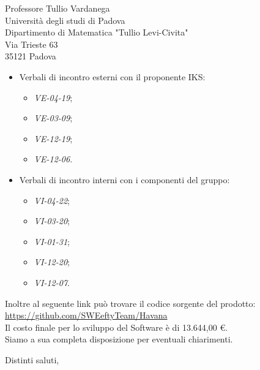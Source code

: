\documentclass[12pt]{letter} %
\begin{document}
\begin{letter}{Professore Tullio Vardanega \\ Università degli studi di Padova \\ Dipartimento di Matematica "Tullio Levi-Civita" \\ Via Trieste 63 \\ 35121 Padova}
\begin{addmargin}[2em]{2em}
\begin{itemize}
      \item Verbali di incontro esterni con il proponente IKS: \begin{itemize}
      	\item \emph{VE-04-19};
      	\item \emph{VE-03-09};
      	\item \emph{VE-12-19};
      	\item \emph{VE-12-06}.
      \end{itemize}
      \item Verbali di incontro interni con i componenti del gruppo:
      \begin{itemize}
      	\item \emph{VI-04-22};
      	\item \emph{VI-03-20};
      	\item \emph{VI-01-31};
      	\item \emph{VI-12-20};
      	\item \emph{VI-12-07}.
      \end{itemize}
      \end{itemize}
	
	Inoltre al seguente link può trovare il codice sorgente del prodotto: \\
	\href{https://github.com/SWEeftyTeam/Havana}{https://github.com/SWEeftyTeam/Havana}\\ 

	  Il costo finale per lo sviluppo del Software è di 13.644,00 \euro.
	  \\ Siamo a sua completa disposizione per eventuali chiarimenti.
  
\end{addmargin}

\closing{Distinti saluti,}





\end{letter}
 
\end{document}

